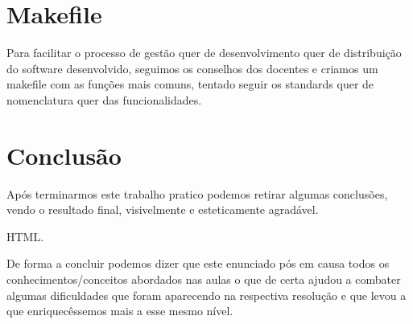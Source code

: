 \documentclass[12pt,letterpaper]{article}
\begin{document}
\newpage
\section{Makefile}
Para facilitar o processo de gestão quer de desenvolvimento quer de distribuição do software desenvolvido, seguimos os conselhos dos docentes e criamos um makefile com as funções mais comuns, tentado seguir os standards quer de nomenclatura quer das funcionalidades.

\newpage
\section{Conclusão}
Após terminarmos este trabalho pratico podemos retirar algumas conclusões, vendo o resultado final, visivelmente e esteticamente agradável.

HTML.

De forma a concluir podemos dizer que este enunciado pós em causa todos os conhecimentos/conceitos abordados nas aulas o que de certa ajudou a combater algumas dificuldades que foram aparecendo na respectiva resolução e que levou a que enriquecêssemos mais a esse mesmo nível.
\end{document}
